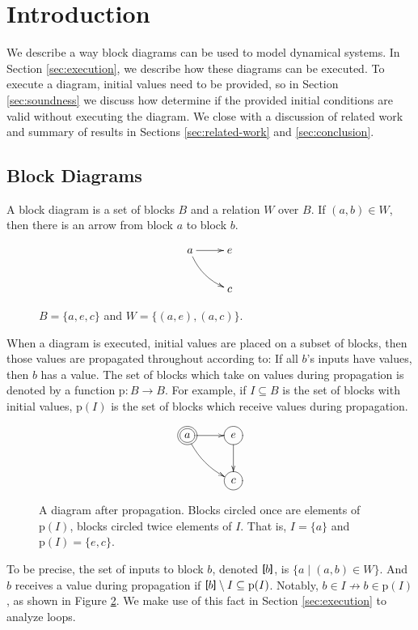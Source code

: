 \documentclass[twocolumn]{article}
\newcommand{\TightBracketB}[1]{\raisebox{0.25ex}{\scalebox{0.8}{\boldmath${#1\kern-0.65ex#1}$}}}%
\newcommand*{\Inputs}[1]{\TightBracketB[#1\TightBracketB]}
\begin{document}
\section{Introduction}

We describe a way block diagrams can be used to model dynamical systems. In Section \ref{sec:execution}, we describe how these diagrams can be executed. To execute a diagram, initial values need to be provided, so in Section \ref{sec:soundness} we discuss how determine if the provided initial conditions are valid without executing the diagram. We close with a discussion of related work and summary of results in Sections \ref{sec:related-work} and \ref{sec:conclusion}.

\subsection{Block Diagrams}

A block diagram is a set of blocks $B$ and a relation $W$ over $B$. If $(a, b)\in W$, then there is an arrow from block $a$ to block $b$. 


\begin{figure}[h]
\[
    \xymatrix {
        a \ar[r] \ar@/_/[dr] & e \\
        & c
    }
\]
    \caption{$B=\{a, e, c\}$ and $W=\{(a,e), (a, c)\}$.}
    \label{fig:example1}
\end{figure}

When a diagram is executed, initial values are placed on a subset of blocks, then those values are propagated throughout according to: If all $b$'s inputs have values, then $b$ has a value. The set of blocks which take on values during propagation is denoted by a function $\text{p}:B\rightarrow B$. For example, if $I\subseteq B$ is the set of blocks with initial values, $\text{p}(I)$ is the set of blocks which receive values during propagation.

\begin{figure}[h]
\[
    \xymatrix {
        *++[o][F=]{a} \ar[r] \ar@/_/[dr] & *++[o][F-]{e} \ar[d] \\
        & *++[o][F-]{c}
    }
\]
    \caption{A diagram after propagation. Blocks circled once are elements of $\text{p}(I)$, blocks circled twice elements of $I$. That is, $I=\{a\}$ and $\text{p}(I)=\{e, c\}$.}
    \label{fig:piisnoti}
\end{figure}

To be precise, the set of inputs to block $b$, denoted $\Inputs{b}$, is $\{a \mid (a, b)\in W\}$. And $b$ receives a value during propagation if $\Inputs{b}\setminus I\subseteq \text{p}(I)$. Notably, $b\in I\not\rightarrow b\in \text{p}(I)$, as shown in Figure \ref{fig:piisnoti}. We make use of this fact in Section \ref{sec:execution} to analyze loops.
\end{document}
